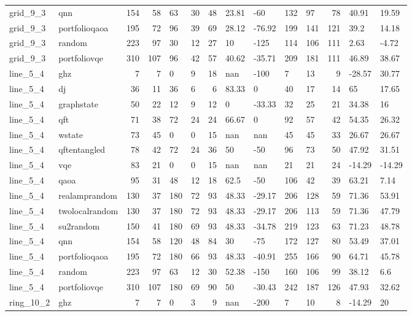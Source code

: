 \begin{longtable}{llrrllrllllrll}
grid\_9\_3 & qnn & 154 & 58 & 63 & 30 & 48 & 23.81 & -60 & 132 & 97 & 78 & 40.91 & 19.59 \\
grid\_9\_3 & portfolioqaoa & 195 & 72 & 96 & 39 & 69 & 28.12 & -76.92 & 199 & 141 & 121 & 39.2 & 14.18 \\
grid\_9\_3 & random & 223 & 97 & 30 & 12 & 27 & 10 & -125 & 114 & 106 & 111 & 2.63 & -4.72 \\
grid\_9\_3 & portfoliovqe & 310 & 107 & 96 & 42 & 57 & 40.62 & -35.71 & 209 & 181 & 111 & 46.89 & 38.67 \\
line\_5\_4 & ghz & 7 & 7 & 0 & 9 & 18 & nan & -100 & 7 & 13 & 9 & -28.57 & 30.77 \\
line\_5\_4 & dj & 36 & 11 & 36 & 6 & 6 & 83.33 & 0 & 40 & 17 & 14 & 65 & 17.65 \\
line\_5\_4 & graphstate & 50 & 22 & 12 & 9 & 12 & 0 & -33.33 & 32 & 25 & 21 & 34.38 & 16 \\
line\_5\_4 & qft & 71 & 38 & 72 & 24 & 24 & 66.67 & 0 & 92 & 57 & 42 & 54.35 & 26.32 \\
line\_5\_4 & wstate & 73 & 45 & 0 & 0 & 15 & nan & nan & 45 & 45 & 33 & 26.67 & 26.67 \\
line\_5\_4 & qftentangled & 78 & 42 & 72 & 24 & 36 & 50 & -50 & 96 & 73 & 50 & 47.92 & 31.51 \\
line\_5\_4 & vqe & 83 & 21 & 0 & 0 & 15 & nan & nan & 21 & 21 & 24 & -14.29 & -14.29 \\
line\_5\_4 & qaoa & 95 & 31 & 48 & 12 & 18 & 62.5 & -50 & 106 & 42 & 39 & 63.21 & 7.14 \\
line\_5\_4 & realamprandom & 130 & 37 & 180 & 72 & 93 & 48.33 & -29.17 & 206 & 128 & 59 & 71.36 & 53.91 \\
line\_5\_4 & twolocalrandom & 130 & 37 & 180 & 72 & 93 & 48.33 & -29.17 & 206 & 113 & 59 & 71.36 & 47.79 \\
line\_5\_4 & su2random & 150 & 41 & 180 & 69 & 93 & 48.33 & -34.78 & 219 & 123 & 63 & 71.23 & 48.78 \\
line\_5\_4 & qnn & 154 & 58 & 120 & 48 & 84 & 30 & -75 & 172 & 127 & 80 & 53.49 & 37.01 \\
line\_5\_4 & portfolioqaoa & 195 & 72 & 180 & 66 & 93 & 48.33 & -40.91 & 255 & 166 & 90 & 64.71 & 45.78 \\
line\_5\_4 & random & 223 & 97 & 63 & 12 & 30 & 52.38 & -150 & 160 & 106 & 99 & 38.12 & 6.6 \\
line\_5\_4 & portfoliovqe & 310 & 107 & 180 & 69 & 90 & 50 & -30.43 & 242 & 187 & 126 & 47.93 & 32.62 \\
ring\_10\_2 & ghz & 7 & 7 & 0 & 3 & 9 & nan & -200 & 7 & 10 & 8 & -14.29 & 20 \\

\end{longtable}
